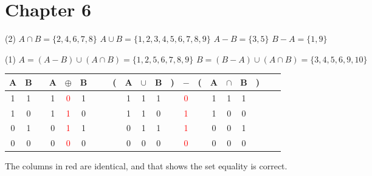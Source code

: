    \section*{Chapter 6}
    
\begin{Solution}{6.1}
\quad
\begin{tasks}(2)
    \task $A \cap B =\{2,4,6,7,8\}$
    \task $A \cup B = \{1,2,3,4,5,6,7,8,9\}$
    \task $A - B=\{3,5\}$
    \task $B - A = \{1,9\}$
\end{tasks}
\end{Solution}
\begin{Solution}{6.2}
\quad
\begin{tasks}(1)
    \task $A=(A - B) \cup (A \cap B) = \{1,2,5,6,7,8,9\}$
    \task $B=(B - A) \cup (A \cap B) = \{3,4,5,6,9,10\}$
\end{tasks}
\end{Solution}

\begin{Solution}{6.3}
\quad
\begin{tabular}{@{ }c@{ }@{ }c | c@{ }@{ }c@{ }@{ }c@{ }@{ }c@{ }@{ }c | c@{ }@{}c@{}@{ }c@{ }@{ }c@{ }@{ }c@{ }@{}c@{}@{ }c@{ }@{ }c@{ }@{}c@{}@{ }c@{ }@{ }c@{ }@{ }c@{ }@{}c@{}@{ }c}
A & B &  & A & $\oplus$ & B &  &  & ( & A & $\cup$ & B & ) &  $-$ & ( & A & $\cap$ & B & ) & \\
\hline
1 & 1 &  & 1 & \textcolor{red}{0} & 1 &  &  &  & 1 & 1 & 1 & & \textcolor{red}{0} &   & 1 & 1 & 1 &  & \\
1 & 0 &  & 1 & \textcolor{red}{1} & 0 &  &  &  & 1 & 1 & 0 & & \textcolor{red}{1} &   & 1 & 0 & 0 &  & \\
0 & 1 &  & 0 & \textcolor{red}{1} & 1 &  &  &  & 0 & 1 & 1 & & \textcolor{red}{1} &   & 0 & 0 & 1 &  & \\
0 & 0 &  & 0 & \textcolor{red}{0} & 0 &  &  &  & 0 & 0 & 0 & & \textcolor{red}{0} &   & 0 & 0 & 0 &  & \\
\end{tabular}

The columns in red are identical, and that shows the set equality is correct.
\end{Solution}


